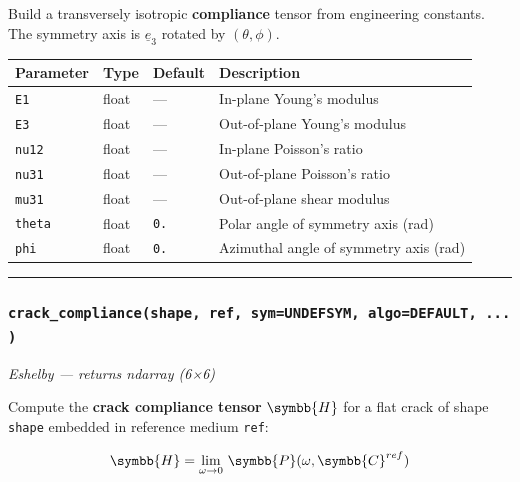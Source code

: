 \documentclass[
  a4paper,
  numbers=noendperiod,
  DIV=12]{scrreprt}
\newcounter{none} %
\newcommand{\uuuu}[1]{{\symbb{{#1}}}}
\newcommand{\uv}[1]{{\underline{{#1}}}}
\begin{document}
Build a transversely isotropic \textbf{compliance} tensor from
engineering constants. The symmetry axis is \(\uv{e}_3\) rotated by
\((\theta,\phi)\).

{\def\LTcaptype{none} %
\begin{longtable}[]{@{}llll@{}}
\toprule\noalign{}
Parameter & Type & Default & Description \\
\midrule\noalign{}
\endhead
\bottomrule\noalign{}
\endlastfoot
\texttt{E1} & float & --- & In-plane Young's modulus \\
\texttt{E3} & float & --- & Out-of-plane Young's modulus \\
\texttt{nu12} & float & --- & In-plane Poisson's ratio \\
\texttt{nu31} & float & --- & Out-of-plane Poisson's ratio \\
\texttt{mu31} & float & --- & Out-of-plane shear modulus \\
\texttt{theta} & float & \texttt{0.} & Polar angle of symmetry axis
(rad) \\
\texttt{phi} & float & \texttt{0.} & Azimuthal angle of symmetry axis
(rad) \\
\end{longtable}
}

\begin{center}\rule{0.5\linewidth}{0.5pt}\end{center}

\subsubsection{\texorpdfstring{\texttt{crack\_compliance(shape,\ ref,\ sym=UNDEFSYM,\ algo=DEFAULT,\ ...)}}{crack\_compliance(shape, ref, sym=UNDEFSYM, algo=DEFAULT, ...)}}\label{api-crack-compliance}

\emph{Eshelby --- returns ndarray (6×6)}

Compute the \textbf{crack compliance tensor} \(\uuuu{H}\) for a flat
crack of shape \texttt{shape} embedded in reference medium \texttt{ref}:

\[\uuuu{H} = \lim_{\omega\to 0}\,\uuuu{P}(\omega,\uuuu{C}^{ref})\]
\end{document}
